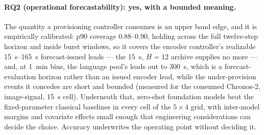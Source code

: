 \paragraph{RQ2 (operational forecastability): yes, with a bounded
meaning.} The quantity a provisioning controller consumes is an upper band
edge, and it is empirically calibrated: p90 coverage $0.88$--$0.90$, holding
across the full twelve-step horizon and inside burst windows, so it covers
the encoder controller's realizable \SIrange{15}{165}{\second}
forecast-issued leads --- the \SI{15}{\second}, $H{=}12$ archive supplies no
more --- and, at \SI{1}{\minute} bins, the language pool's leads out to
\SI{300}{\second}, which is a forecast-evaluation horizon rather than an
issued encoder lead, while the
under-provision events it concedes are short and bounded (measured for the
consumed Chronos-2, image-signal, \SI{15}{\second} cell). Underneath that,
zero-shot foundation models beat the fixed-parameter classical baselines in
every cell of the $5{\times}4$ grid, with inter-model margins and covariate
effects small enough that engineering considerations can decide the choice.
Accuracy underwrites the operating point without deciding it.


